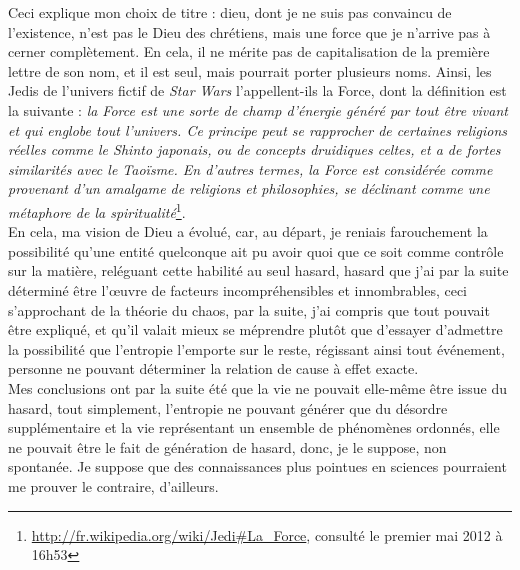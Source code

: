 \documentclass[12pt,a4paper]{article}
\begin{document}
{Ceci explique mon choix de titre : \og{}dieu\fg{}, dont je ne suis pas convaincu de l'existence, n'est pas le Dieu des chrétiens, mais une force que je n'arrive pas à cerner complètement. En cela, \og{}il\fg{} ne mérite pas de capitalisation de la première lettre de son nom, et il est seul, mais pourrait porter plusieurs noms. Ainsi, les Jedis de l'univers fictif de \emph{Star Wars} l'appellent-ils \og{}la Force\fg{}, dont la définition est la suivante : \emph{la Force est une sorte de champ d'énergie généré par tout être vivant et qui englobe tout l'univers. Ce principe peut se rapprocher de certaines religions réelles comme le Shinto japonais, ou de concepts druidiques celtes, et a de fortes similarités avec le Taoïsme. En d'autres termes, la Force est considérée comme provenant d'un amalgame de religions et philosophies, se déclinant comme une métaphore de la spiritualité}\footnote{\url{http://fr.wikipedia.org/wiki/Jedi#La_Force}, consulté le premier mai 2012 à 16h53}.\\

En cela, ma vision de Dieu a évolué, car, au départ, je reniais farouchement la possibilité qu'une entité quelconque ait pu avoir quoi que ce soit comme contrôle sur la matière, reléguant cette habilité au seul hasard, hasard que j'ai par la suite déterminé être l'\oe{}uvre de facteurs incompréhensibles et innombrables, ceci s'approchant de la théorie du chaos, par la suite, j'ai compris que tout pouvait être expliqué, et qu'il valait mieux se méprendre plutôt que d'essayer d'admettre la possibilité que l'entropie l'emporte sur le reste, régissant ainsi tout événement, personne ne pouvant déterminer la relation de cause à effet exacte. \\

Mes conclusions ont par la suite été que la vie ne pouvait elle-même être issue du hasard, tout simplement, l'entropie ne pouvant générer que du désordre supplémentaire et la vie représentant un ensemble de phénomènes ordonnés, elle ne pouvait être le fait de génération de hasard, donc, je le suppose, non spontanée. Je suppose que des connaissances plus pointues en sciences pourraient me prouver le contraire, d'ailleurs.\\

}
\end{document}
